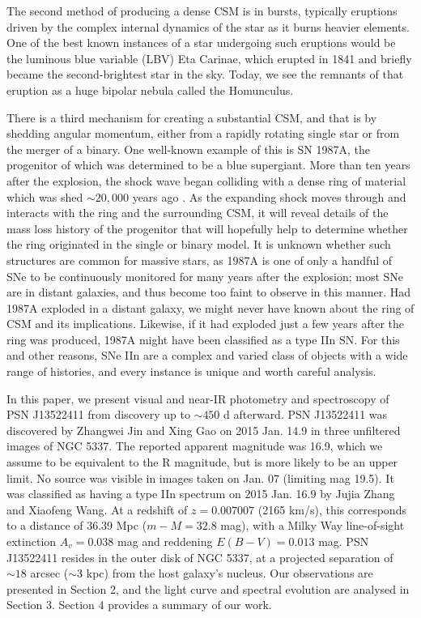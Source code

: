 \documentclass[iop]{emulateapj}
\begin{document}
The second method of producing a dense CSM is in bursts, typically eruptions driven by the complex internal dynamics of the star as it burns heavier elements. One of the best known instances of a star undergoing such eruptions would be the luminous blue variable (LBV) Eta Carinae, which erupted in 1841 and briefly became the second-brightest star in the sky. Today, we see the remnants of that eruption as a huge bipolar nebula called the Homunculus.

There is a third mechanism for creating a substantial CSM, and that is by shedding angular momentum, either from a rapidly rotating single star or from the merger of a binary. One well-known example of this is SN 1987A, the progenitor of which was determined to be a blue supergiant. More than ten years after the explosion, the shock wave began colliding with a dense ring of material which was shed $\sim20,000$ years ago \citep{Fra15}. As the expanding shock moves through and interacts with the ring and the surrounding CSM, it will reveal details of the mass loss history of the progenitor that will hopefully help to determine whether the ring originated in the single or binary model. It is unknown whether such structures are common for massive stars, as 1987A is one of only a handful of SNe to be continuously monitored for many years after the explosion; most SNe are in distant galaxies, and thus become too faint to observe in this manner. Had 1987A exploded in a distant galaxy, we might never have known about the ring of CSM and its implications. Likewise, if it had exploded just a few years after the ring was produced, 1987A might have been classified as a type IIn SN. For this and other reasons, SNe IIn are a complex and varied class of objects with a wide range of histories, and every instance is unique and worth careful analysis.

In this paper, we present visual and near-IR photometry and spectroscopy of PSN J13522411 from discovery up to $\sim450$ d afterward. PSN J13522411 was discovered by Zhangwei Jin and Xing Gao on 2015 Jan. 14.9 in three unfiltered images of NGC 5337. The reported apparent magnitude was 16.9, which we assume to be equivalent to the R magnitude, but is more likely to be an upper limit. No source was visible in images taken on Jan. 07 (limiting mag 19.5). It was classified as having a type IIn spectrum on 2015 Jan. 16.9 by Jujia Zhang and Xiaofeng Wang. At a redshift of $z = 0.007007$ (2165 km/s), this corresponds to a distance of 36.39 Mpc ($m - M = 32.8$ mag), with a Milky Way line-of-sight extinction $A_v = 0.038$ mag and reddening $E(B - V) = 0.013$ mag. PSN J13522411 resides in the outer disk of NGC 5337, at a projected separation of $\sim18$ arcsec ($\sim3$ kpc) from the host galaxy's nucleus. Our observations are presented in Section 2, and the light curve and spectral evolution are analysed in Section 3. Section 4 provides a summary of our work.
\end{document}
